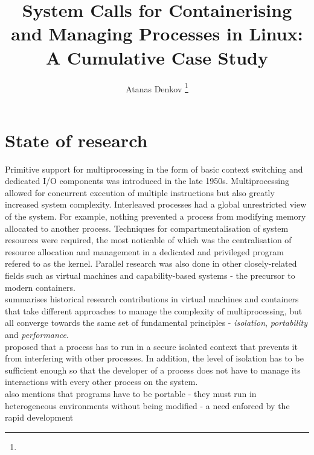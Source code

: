 \documentclass[english]{lni}
\begin{document}
\title[System Calls for Containerising and Managing Processes in Linux]
{System Calls for Containerising and Managing Processes in Linux: 
A Cumulative Case Study}

\author[Atanas Denkov]{Atanas Denkov \footnote{}}

\maketitle 

\section{State of research}
Primitive support for multiprocessing in the form of basic context switching and 
dedicated I/O components was introduced in the late 1950s.
Multiprocessing allowed for concurrent execution of multiple instructions but 
also greatly increased system complexity. 
Interleaved processes had a global unrestricted view of the system. 
For example, nothing prevented a process from modifying memory allocated to 
another process.
Techniques for compartmentalisation of system resources were required, the 
most noticable of which was the centralisation of resource allocation and 
management in a dedicated and privileged program refered to as the kernel. 
Parallel research was also done in other closely-related fields such as 
virtual machines and capability-based systems - the precursor to modern 
containers.\\
\citeauthor{10.1145/3365199} \cite{10.1145/3365199} summarises historical 
research contributions in virtual machines and containers 
that take different approaches to manage the complexity of multiprocessing, 
but all converge towards the same set of fundamental principles - 
\textit{isolation}, \textit{portability} and \textit{performance}.\\ 
\citeauthor{10.1145/368481.368502} \cite{10.1145/368481.368502} proposed that a 
process has to run in a secure isolated context that prevents it from 
interfering with other processes. In addition, the level of isolation has to be 
sufficient enough so that the developer of a process does not have to manage its 
interactions with every other process on the system. \\
\citeauthor{10.1145/368481.368502} \cite{10.1145/368481.368502} also mentions
that programs have to be portable - they must run in heterogeneous 
environments without being modified - a need enforced by the rapid development 
\end{document}
